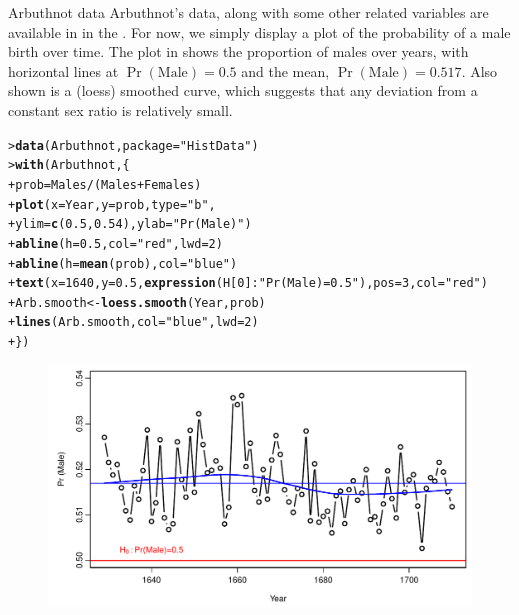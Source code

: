 \documentclass[10pt,krantz2]{krantz}\usepackage[]{graphicx}\usepackage[]{color}
\makeatletter
\newcommand{\hlnum}[1]{\textcolor[rgb]{0.686,0.059,0.569}{#1}}%
\newcommand{\hlstr}[1]{\textcolor[rgb]{0.192,0.494,0.8}{#1}}%
\newcommand{\hlopt}[1]{\textcolor[rgb]{0,0,0}{#1}}%
\newcommand{\hlstd}[1]{\textcolor[rgb]{0.345,0.345,0.345}{#1}}%
\newcommand{\hlkwb}[1]{\textcolor[rgb]{0.69,0.353,0.396}{#1}}%
\newcommand{\hlkwc}[1]{\textcolor[rgb]{0.333,0.667,0.333}{#1}}%
\newcommand{\hlkwd}[1]{\textcolor[rgb]{0.737,0.353,0.396}{\textbf{#1}}}%
\newenvironment{kframe}{%
 \def\at@end@of@kframe{}%
 \ifinner\ifhmode%
  \def\at@end@of@kframe{\end{minipage}}%
  \begin{minipage}{\columnwidth}%
 \fi\fi%
 \def\FrameCommand##1{\hskip\@totalleftmargin \hskip-\fboxsep
 \colorbox{shadecolor}{##1}\hskip-\fboxsep
     \hskip-\linewidth \hskip-\@totalleftmargin \hskip\columnwidth}%
 \MakeFramed {\advance\hsize-\width
   \@totalleftmargin\z@ \linewidth\hsize
   \@setminipage}}%
 {\par\unskip\endMakeFramed%
 \at@end@of@kframe}
\newenvironment{knitrout}{}{} %
\renewenvironment{knitrout}{\small\renewcommand{\baselinestretch}{.85}}{} %
\makeatother
\begin{document}
\begin{Example}[arbuthnot1]{Arbuthnot data}
Arbuthnot's data, along with some other related variables
are available in  in the .
For now, we simply display a plot of the probability of a male birth over time.
The plot in  shows the proportion of males over years,
with horizontal lines at $\Pr(\mathrm{Male}) = 0.5$ and the mean,
$\Pr(\mathrm{Male}) = 0.517$.  Also shown is a (loess) smoothed curve, which suggests
that any deviation from a constant sex ratio is relatively small.
\begin{knitrout}
\color{fgcolor}\begin{kframe}
\begin{alltt}
\hlstd{> }\hlkwd{data}\hlstd{(Arbuthnot,} \hlkwc{package} \hlstd{=} \hlstr{"HistData"}\hlstd{)}
\hlstd{> }\hlkwd{with}\hlstd{(Arbuthnot, \{}
\hlstd{+ }  \hlstd{prob} \hlkwb{=} \hlstd{Males} \hlopt{/} \hlstd{(Males} \hlopt{+} \hlstd{Females)}
\hlstd{+ }  \hlkwd{plot}\hlstd{(}\hlkwc{x} \hlstd{= Year,} \hlkwc{y} \hlstd{= prob,} \hlkwc{type} \hlstd{=} \hlstr{"b"}\hlstd{,}
\hlstd{+ }       \hlkwc{ylim} \hlstd{=} \hlkwd{c}\hlstd{(}\hlnum{0.5}\hlstd{,} \hlnum{0.54}\hlstd{),} \hlkwc{ylab} \hlstd{=} \hlstr{"Pr (Male)"}\hlstd{)}
\hlstd{+ }  \hlkwd{abline}\hlstd{(}\hlkwc{h} \hlstd{=} \hlnum{0.5}\hlstd{,} \hlkwc{col} \hlstd{=} \hlstr{"red"}\hlstd{,} \hlkwc{lwd} \hlstd{=} \hlnum{2}\hlstd{)}
\hlstd{+ }  \hlkwd{abline}\hlstd{(}\hlkwc{h} \hlstd{=} \hlkwd{mean}\hlstd{(prob),} \hlkwc{col} \hlstd{=} \hlstr{"blue"}\hlstd{)}
\hlstd{+ }  \hlkwd{text}\hlstd{(}\hlkwc{x} \hlstd{=} \hlnum{1640}\hlstd{,} \hlkwc{y} \hlstd{=} \hlnum{0.5}\hlstd{,} \hlkwd{expression}\hlstd{(H[}\hlnum{0}\hlstd{]}\hlopt{:} \hlstr{"Pr(Male)=0.5"}\hlstd{),} \hlkwc{pos} \hlstd{=} \hlnum{3}\hlstd{,} \hlkwc{col} \hlstd{=} \hlstr{"red"}\hlstd{)}
\hlstd{+ }  \hlstd{Arb.smooth} \hlkwb{<-} \hlkwd{loess.smooth}\hlstd{(Year, prob)}
\hlstd{+ }  \hlkwd{lines}\hlstd{(Arb.smooth,} \hlkwc{col} \hlstd{=} \hlstr{"blue"}\hlstd{,} \hlkwc{lwd} \hlstd{=} \hlnum{2}\hlstd{)}
\hlstd{+ }  \hlstd{\})}
\end{alltt}
\end{kframe}\begin{figure}[!htbp]

\centerline{\includegraphics[width=.75\textwidth]{ch03/fig/arbuthnot1-1} }


\end{figure}
\end{knitrout}
\end{Example}
\end{document}
